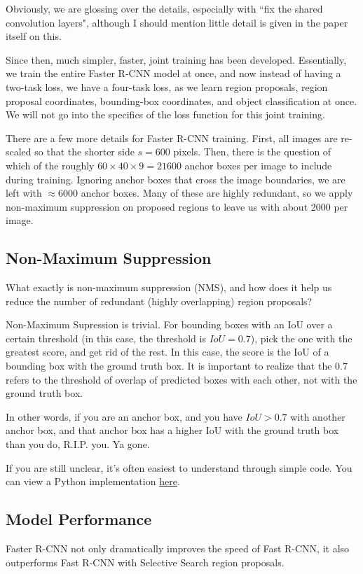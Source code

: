 \documentclass{article}
\begin{document}
Obviously, we are glossing over the details, especially with ``fix the shared convolution layers", although I should mention little detail is given in the paper itself on this.

Since then, much simpler, faster, joint training has been developed. Essentially, we train the entire Faster R-CNN model at once, and now instead of having a two-task loss, we have a four-task loss, as we learn region proposals, region proposal coordinates, bounding-box coordinates, and object classification at once. We will not go into the specifics of the loss function for this joint training.


There are a few more details for Faster R-CNN training. First, all images are re-scaled so that the shorter side $s=600$ pixels. Then, there is the question of which of the roughly $60\times40\times9=21600$ anchor boxes per image to include during training. Ignoring anchor boxes that cross the image boundaries, we are left with $\approx 6000$ anchor boxes. Many of these are highly redundant, so we apply non-maximum suppression on proposed regions to leave us with about 2000 per image.

\subsection{Non-Maximum Suppression}
What exactly is non-maximum suppression (NMS), and how does it help us reduce the number of redundant (highly overlapping) region proposals?

Non-Maximum Supression is trivial. For bounding boxes with an IoU over a certain threshold (in this case, the threshold is $IoU=0.7$), pick the one with the greatest score, and get rid of the rest. In this case, the score is the IoU of a bounding box with the ground truth box. It is important to realize that the $0.7$ refers to the threshold of overlap of predicted boxes with each other, not with the ground truth box.

In other words, if you are an anchor box, and you have $IoU>0.7$ with another anchor box, and that anchor box has a higher IoU with the ground truth box than you do, R.I.P. you. Ya gone.

If you are still unclear, it's often easiest to understand through simple code. You can view a Python implementation \href{https://github.com/vmalpani/NonMaximalSuppression/blob/master/non_maximal_suppression.py}{here}.

\subsection{Model Performance}
Faster R-CNN not only dramatically improves the speed of Fast R-CNN, it also outperforms Fast R-CNN with Selective Search region proposals.
\end{document}
